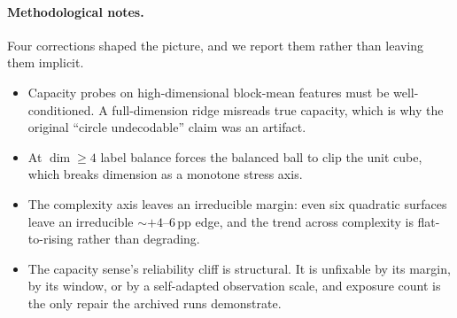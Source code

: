 \documentclass[preprint,12pt]{elsarticle}
\begin{document}
\paragraph{Methodological notes.} Four corrections shaped the picture, and we
report them rather than leaving them implicit.
\begin{itemize}[leftmargin=1.4em,itemsep=2pt,topsep=2pt]
\item Capacity probes on high-dimensional block-mean features must be
well-conditioned. A full-dimension ridge misreads true capacity, which is why
the original ``circle undecodable'' claim was an artifact.
\item At $\dim\geq4$ label balance forces the balanced ball to clip the unit
cube, which breaks dimension as a monotone stress axis.
\item The complexity axis leaves an irreducible margin: even six quadratic
surfaces leave an irreducible $\sim+4$--$6$\,pp edge, and the trend across
complexity is flat-to-rising rather than degrading.
\item The capacity sense's reliability cliff is structural. It is unfixable by
its margin, by its window, or by a self-adapted observation scale, and
exposure count is the only repair the archived runs demonstrate.
\end{itemize}
\end{document}
